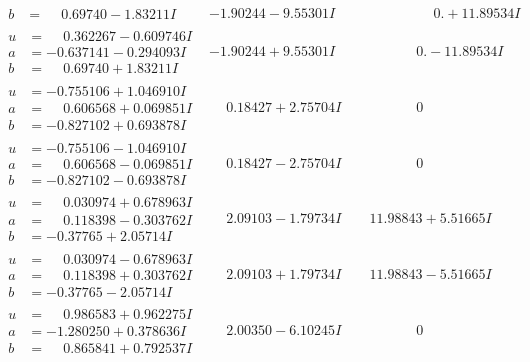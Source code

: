 \documentclass[1p]{elsarticle_modified}
\theoremstyle{definition}
\begin{document}
$$\begin{array}{c|c|c}
\begin{aligned}
b &= \phantom{-}0.69740 - 1.83211 I\end{aligned}
 & -1.90244 - 9.55301 I & \phantom{-0.000000 -}0. + 11.89534 I \\ \hline\begin{aligned}
u &= \phantom{-}0.362267 - 0.609746 I \\
a &= -0.637141 - 0.294093 I \\
b &= \phantom{-}0.69740 + 1.83211 I\end{aligned}
 & -1.90244 + 9.55301 I & \phantom{-0.000000 } 0. - 11.89534 I \\ \hline\begin{aligned}
u &= -0.755106 + 1.046910 I \\
a &= \phantom{-}0.606568 + 0.069851 I \\
b &= -0.827102 + 0.693878 I\end{aligned}
 & \phantom{-}0.18427 + 2.75704 I & \phantom{-0.000000 } 0 \\ \hline\begin{aligned}
u &= -0.755106 - 1.046910 I \\
a &= \phantom{-}0.606568 - 0.069851 I \\
b &= -0.827102 - 0.693878 I\end{aligned}
 & \phantom{-}0.18427 - 2.75704 I & \phantom{-0.000000 } 0 \\ \hline\begin{aligned}
u &= \phantom{-}0.030974 + 0.678963 I \\
a &= \phantom{-}0.118398 - 0.303762 I \\
b &= -0.37765 + 2.05714 I\end{aligned}
 & \phantom{-}2.09103 - 1.79734 I & \phantom{-}11.98843 + 5.51665 I \\ \hline\begin{aligned}
u &= \phantom{-}0.030974 - 0.678963 I \\
a &= \phantom{-}0.118398 + 0.303762 I \\
b &= -0.37765 - 2.05714 I\end{aligned}
 & \phantom{-}2.09103 + 1.79734 I & \phantom{-}11.98843 - 5.51665 I \\ \hline\begin{aligned}
u &= \phantom{-}0.986583 + 0.962275 I \\
a &= -1.280250 + 0.378636 I \\
b &= \phantom{-}0.865841 + 0.792537 I\end{aligned}
 & \phantom{-}2.00350 - 6.10245 I & \phantom{-0.000000 } 0\\

\end{array}$$
\end{document}
